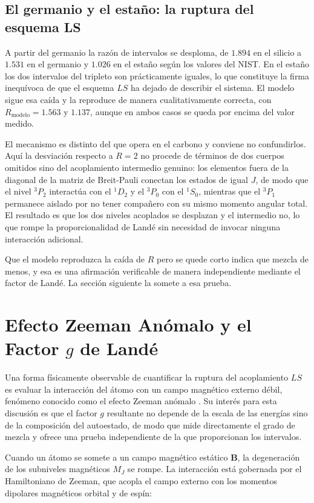 \subsection{El germanio y el estaño: la ruptura del esquema LS}

A partir del germanio la razón de intervalos se desploma, de $1.894$ en el silicio a $1.531$ en el germanio y $1.026$ en el estaño según los valores del NIST. En el estaño los dos intervalos del tripleto son prácticamente iguales, lo que constituye la firma inequívoca de que el esquema $LS$ ha dejado de describir el sistema. El modelo sigue esa caída y la reproduce de manera cualitativamente correcta, con $R_{\text{modelo}} = 1.563$ y $1.137$, aunque en ambos casos se queda por encima del valor medido.

El mecanismo es distinto del que opera en el carbono y conviene no confundirlos. Aquí la desviación respecto a $R = 2$ no procede de términos de dos cuerpos omitidos sino del acoplamiento intermedio genuino: los elementos fuera de la diagonal de la matriz de Breit-Pauli conectan los estados de igual $J$, de modo que el nivel $^3P_2$ interactúa con el $^1D_2$ y el $^3P_0$ con el $^1S_0$, mientras que el $^3P_1$ permanece aislado por no tener compañero con su mismo momento angular total. El resultado es que los dos niveles acoplados se desplazan y el intermedio no, lo que rompe la proporcionalidad de Landé sin necesidad de invocar ninguna interacción adicional.

Que el modelo reproduzca la caída de $R$ pero se quede corto indica que mezcla de menos, y esa es una afirmación verificable de manera independiente mediante el factor de Landé. La sección siguiente la somete a esa prueba.

\section{Efecto Zeeman Anómalo y el Factor $g$ de Landé}

Una forma físicamente observable de cuantificar la ruptura del acoplamiento $LS$ es evaluar la interacción del átomo con un campo magnético externo débil, fenómeno conocido como el efecto Zeeman anómalo \cite{CohenTannoudji1977}. Su interés para esta discusión es que el factor $g$ resultante no depende de la escala de las energías sino de la composición del autoestado, de modo que mide directamente el grado de mezcla y ofrece una prueba independiente de la que proporcionan los intervalos.

Cuando un átomo se somete a un campo magnético estático $\mathbf{B}$, la degeneración de los subniveles magnéticos $M_J$ se rompe. La interacción está gobernada por el Hamiltoniano de Zeeman, que acopla el campo externo con los momentos dipolares magnéticos orbital y de espín:


